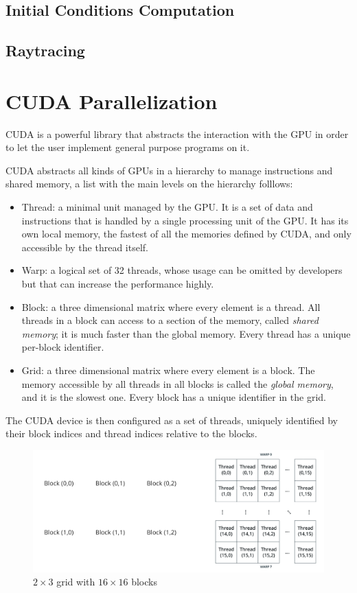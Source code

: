 \subsection{Initial Conditions Computation}
\subsection{Raytracing}

\section{CUDA Parallelization}

\ac{CUDA} is a powerful library that abstracts the interaction with the \ac{GPU} in order to let the user implement general purpose programs on it.

\ac{CUDA} abstracts all kinds of \acp{GPU} in a hierarchy to manage instructions and shared memory, a list with the main levels on the hierarchy folllows:
\begin{itemize}
	\item Thread: a minimal unit managed by the \ac{GPU}. It is a set of data and instructions that is handled by a single processing unit of the \ac{GPU}. It has its own local memory, the fastest of all the memories defined by \ac{CUDA}, and only accessible by the thread itself.
	\item Warp: a logical set of 32 threads, whose usage can be omitted by developers but that can increase the performance highly.
	\item Block: a three dimensional matrix where every element is a thread. All threads in a block can access to a section of the memory, called \emph{shared memory}; it is much faster than the global memory. Every thread has a unique per-block identifier.
	\item Grid: a three dimensional matrix where every element is a block. The memory accessible by all threads in all blocks is called the \emph{global memory}, and it is the slowest one. Every block has a unique identifier in the grid.
\end{itemize}

The \ac{CUDA} device is then configured as a set of threads, uniquely identified by their block indices and thread indices relative to the blocks.

\begin{figure}[bth]
	\myfloatalign
	\includegraphics[width=.8\linewidth]{gfx/cudagrid.png}
	\caption[$2\times3$ grid with $16\times16$ blocks]{$2\times3$ grid with $16\times16$ blocks}
	\label{fig:cudagrid}
\end{figure}

